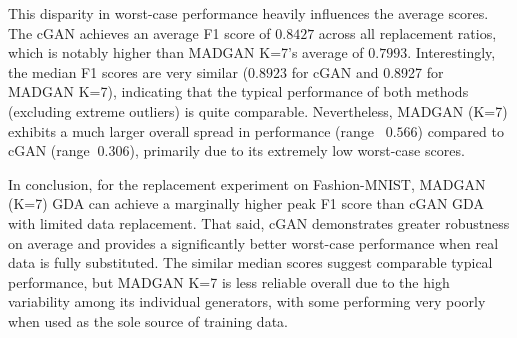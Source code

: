 This disparity in worst-case performance heavily influences the average scores. The cGAN achieves an average F1 score of $0.8427$ across all replacement ratios, which is notably higher than MADGAN K=7's average of $0.7993$. Interestingly, the median F1 scores are very similar ($0.8923$ for cGAN and 0.8927 for MADGAN K=7), indicating that the typical performance of both methods (excluding extreme outliers) is quite comparable. Nevertheless, MADGAN (K=7) exhibits a much larger overall spread in performance (range ~$0.566$) compared to cGAN (range $~0.306$), primarily due to its extremely low worst-case scores.

In conclusion, for the replacement experiment on Fashion-MNIST, MADGAN (K=7) GDA can achieve a marginally higher peak F1 score than cGAN GDA with limited data replacement. That said, cGAN demonstrates greater robustness on average and provides a significantly better worst-case performance when real data is fully substituted. The similar median scores suggest comparable typical performance, but MADGAN K=7 is less reliable overall due to the high variability among its individual generators, with some performing very poorly when used as the sole source of training data.

